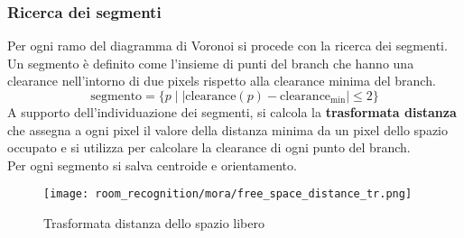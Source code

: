 \subsubsection{Ricerca dei segmenti}
Per ogni ramo del diagramma di Voronoi si procede con la ricerca dei segmenti. \\
Un segmento è definito come l'insieme di punti del branch che hanno una clearance nell'intorno di due pixels rispetto alla clearance minima del branch.
\begin{equation}
  \text{segmento} = \{p \mid | \text{clearance}(p) - \text{clearance}_{\text{min}} | \leq 2\}
\end{equation}
A supporto dell'individuazione dei segmenti, si calcola la \textbf{trasformata distanza} che assegna a ogni pixel il valore della distanza minima da un pixel dello spazio occupato e si utilizza per calcolare la clearance di ogni punto del branch.\\Per ogni segmento si salva centroide e orientamento.
\begin{figure}[H]
  \centering
  \texttt{[image: room\_recognition/mora/free\_space\_distance\_tr.png]}
  \caption{Trasformata distanza dello spazio libero}
\end{figure}
